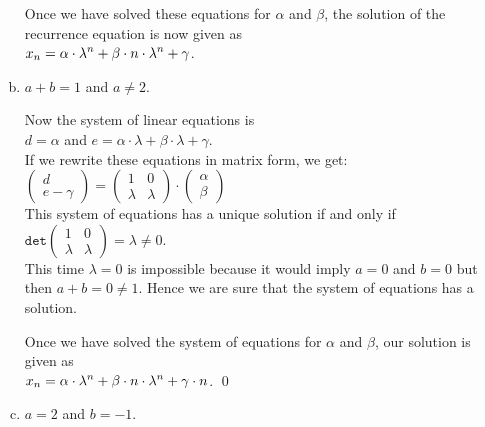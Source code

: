 \begin{enumerate}[(a)]
      Once we have solved these equations for $\alpha$ and
      $\beta$, the solution of the recurrence equation is now given as
      \\[0.2cm]
      \hspace*{1.3cm}
      $\displaystyle x_{n} = \alpha \cdot \lambda^n + \beta \cdot n \cdot \lambda^n + \gamma$.
\item $a + b = 1$ \quad and $a \not= 2$.
    
      Now the system of linear equations is 
      \\[0.2cm]
      \hspace*{1.3cm}
      $d = \alpha$ \quad and \quad $e = \alpha \cdot \lambda + \beta \cdot \lambda + \gamma$. 
      \\[0.2cm]
      If we rewrite these equations in matrix form, we get:
      \\[0.2cm]
      \hspace*{1.3cm}
      $
      \left(\begin{array}{c}
             d \\
             e - \gamma
            \end{array}
      \right) =
      \left(
        \begin{array}{cc}
          1 & 0 \\
          \lambda & \lambda
        \end{array}
      \right) \cdot
      \left(
        \begin{array}{c}
          \alpha \\
          \beta
        \end{array}
      \right)
      $
      \\[0.2cm]      
      This system of equations has a unique solution if and only if
      \\[0.2cm]
      \hspace*{1.3cm}
            $\texttt{det}\left(
              \begin{array}{cc}
                1       & 0        \\
                \lambda & \lambda
              \end{array}
               \right) = \lambda \not= 0$.
      \\[0.2cm]
      This time $\lambda = 0$ is impossible because it would imply $a = 0$ and $b = 0$
      but then $a + b = 0 \not= 1$.  Hence we are sure that the system of equations has a solution.

      Once we have solved the system of equations for $\alpha$ and $\beta$, our solution is given as
      \\[0.2cm]
      \hspace*{1.3cm}
      $\displaystyle x_{n} = \alpha \cdot \lambda^n + \beta \cdot n \cdot \lambda^n + \gamma \cdot n$. \qed
\item $a = 2$ and $b = -1$.


\end{enumerate}
